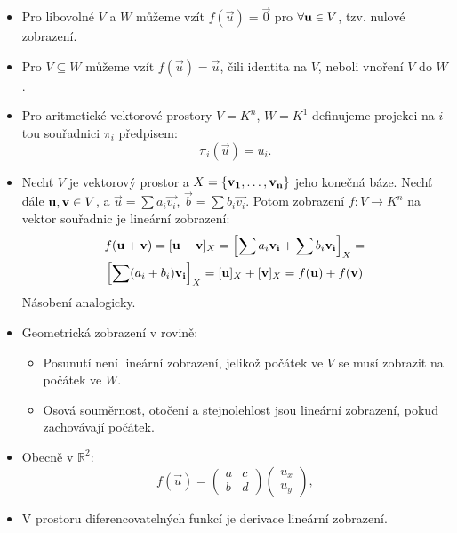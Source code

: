 \begin{remark}
    \leavevmode
    \begin{itemize}
        \item Pro libovolné $V$ a $W$ můžeme vzít $f(\vec{u}) = \vec{0}$
            pro $\forall \mathbf{u} \in V$, tzv. nulové zobrazení.
        \item Pro $V \subseteq W$ můžeme vzít $f(\vec{u}) = \vec{u}$, čili
            identita na $V$, neboli vnoření $V$ do $W$.
        \item Pro aritmetické vektorové prostory $V = K^n$, $W = K^1$ 
            definujeme projekci na $i$-tou souřadnici $\pi_i$ předpisem:
            $$\pi_i(\vec{u}) = u_i.$$
        \item Nechť $V$ je vektorový prostor a $X = \{\mathbf{v_1}, \dots, \mathbf{v_n}\}$ 
            jeho konečná báze. Nechť dále $\mathbf{u}, \mathbf{v} \in V$, 
            a $\vec{u} = \sum a_i \vec{v_i}$, $\vec{b} = \sum b_i \vec{v_i}.$
            Potom zobrazení $f: V \rightarrow K^n$ na vektor souřadnic 
            je lineární zobrazení:
			\begin{multline*}
				f(\mathbf{u} + \mathbf{v}) = [\mathbf{u} + \mathbf{v}]_X = 
					\left[\sum a_i\mathbf{v_i} + \sum b_i \mathbf{v_i}\right]_X = \\
					\left[\sum (a_i + b_i) \mathbf{v_i} \right]_X = 
					[\mathbf{u}]_X + [\mathbf{v}]_X = f(\mathbf{u}) + f(\mathbf{v})
			\end{multline*}
            Násobení analogicky.
        \item Geometrická zobrazení v rovině:
            \begin{itemize}
                \item Posunutí není lineární zobrazení, jelikož počátek ve
                    $V$ se musí zobrazit na počátek ve $W$.
                \item Osová souměrnost, otočení a stejnolehlost jsou
                    lineární zobrazení, pokud zachovávají počátek.
            \end{itemize}
        \item Obecně v $\mathbb{R}^2$:
            $$f(\vec{u}) = \begin{pmatrix}
                a &c \\
                b &d
            \end{pmatrix} 
            \begin{pmatrix} u_x \\ u_y \end{pmatrix},$$
        \item V prostoru diferencovatelných funkcí je derivace lineární
            zobrazení.
    \end{itemize}
\end{remark}

